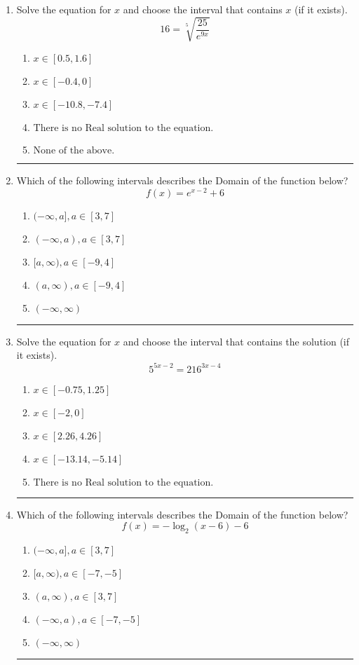 \documentclass[14pt]{extbook}
\newcommand{\litem}[1]{\item#1\hspace*{-1cm}\rule{\textwidth}{0.4pt}}
\begin{document}
\begin{enumerate}
{\begin{enumerate}[label=\Alph*.]
\end{enumerate} }
\litem{
 Solve the equation for $x$ and choose the interval that contains $x$ (if it exists).\[  16 = \sqrt[5]{\frac{25}{e^{9x}}} \]\begin{enumerate}[label=\Alph*.]
\item \( x \in [0.5, 1.6] \)
\item \( x \in [-0.4, 0] \)
\item \( x \in [-10.8, -7.4] \)
\item \( \text{There is no Real solution to the equation.} \)
\item \( \text{None of the above.} \)

\end{enumerate} }
\litem{
Which of the following intervals describes the Domain of the function below?\[ f(x) = e^{x-2}+6 \]\begin{enumerate}[label=\Alph*.]
\item \( (-\infty, a], a \in [3, 7] \)
\item \( (-\infty, a), a \in [3, 7] \)
\item \( [a, \infty), a \in [-9, 4] \)
\item \( (a, \infty), a \in [-9, 4] \)
\item \( (-\infty, \infty) \)

\end{enumerate} }
\litem{
Solve the equation for $x$ and choose the interval that contains the solution (if it exists).\[ 5^{5x-2} = 216^{3x-4} \]\begin{enumerate}[label=\Alph*.]
\item \( x \in [-0.75, 1.25] \)
\item \( x \in [-2, 0] \)
\item \( x \in [2.26, 4.26] \)
\item \( x \in [-13.14, -5.14] \)
\item \( \text{There is no Real solution to the equation.} \)

\end{enumerate} }
\litem{
Which of the following intervals describes the Domain of the function below?\[ f(x) = -\log_2{(x-6)}-6 \]\begin{enumerate}[label=\Alph*.]
\item \( (-\infty, a], a \in [3, 7] \)
\item \( [a, \infty), a \in [-7, -5] \)
\item \( (a, \infty), a \in [3, 7] \)
\item \( (-\infty, a), a \in [-7, -5] \)
\item \( (-\infty, \infty) \)


\end{enumerate}}
\end{enumerate}
\end{document}
